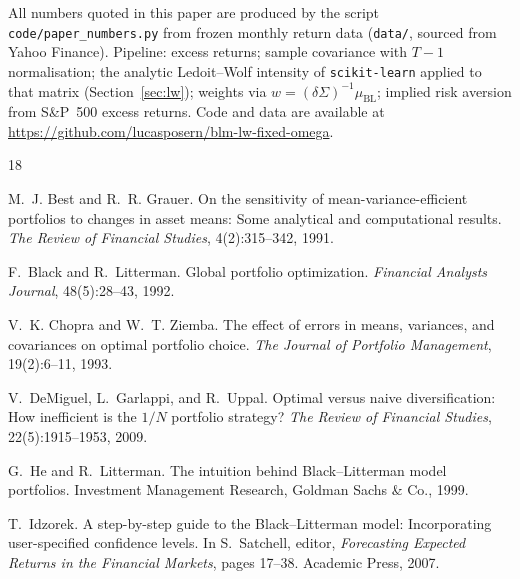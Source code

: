 \documentclass[a4paper,11pt]{article}
\theoremstyle{plain}
\theoremstyle{definition}
\begin{document}
All numbers quoted in this paper are produced by the script
\texttt{code/paper\_numbers.py} from frozen monthly return data
(\texttt{data/}, sourced from Yahoo Finance). Pipeline: excess returns;
sample covariance with $T-1$ normalisation; the analytic Ledoit--Wolf
intensity of \texttt{scikit-learn} applied to that matrix
(Section~\ref{sec:lw}); weights via
$w = (\delta\Sigma)^{-1}\mu_{\mathrm{BL}}$; implied risk aversion from
S\&P~500 excess returns. Code and data are available at
\url{https://github.com/lucasposern/blm-lw-fixed-omega}.


\begin{thebibliography}{18}

M.~J. Best and R.~R. Grauer.
\newblock On the sensitivity of mean-variance-efficient portfolios to
changes in asset means: Some analytical and computational results.
\newblock \emph{The Review of Financial Studies}, 4(2):315--342, 1991.

F.~Black and R.~Litterman.
\newblock Global portfolio optimization.
\newblock \emph{Financial Analysts Journal}, 48(5):28--43, 1992.

V.~K. Chopra and W.~T. Ziemba.
\newblock The effect of errors in means, variances, and covariances on
optimal portfolio choice.
\newblock \emph{The Journal of Portfolio Management}, 19(2):6--11, 1993.

V.~DeMiguel, L.~Garlappi, and R.~Uppal.
\newblock Optimal versus naive diversification: How inefficient is the
$1/N$ portfolio strategy?
\newblock \emph{The Review of Financial Studies}, 22(5):1915--1953, 2009.

G.~He and R.~Litterman.
\newblock The intuition behind Black--Litterman model portfolios.
\newblock Investment Management Research, Goldman Sachs \& Co., 1999.

T.~Idzorek.
\newblock A step-by-step guide to the Black--Litterman model:
Incorporating user-specified confidence levels.
\newblock In S.~Satchell, editor, \emph{Forecasting Expected Returns in
the Financial Markets}, pages 17--38. Academic Press, 2007.


\end{thebibliography}
\end{document}

